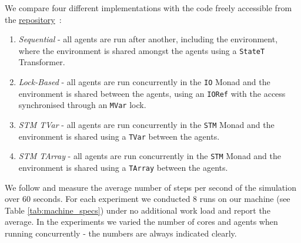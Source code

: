 We compare four different implementations with the code freely accessible from the \href{https://github.com/thalerjonathan/haskell-stm-sugarscape}{repository}~\cite{thaler_stm_sugarscape_repository}:

\begin{enumerate}
	\item \textit{Sequential} - all agents are run after another, including the environment, where the environment is shared amongst the agents using a \texttt{StateT} Transformer.
	\item \textit{Lock-Based} - all agents are run concurrently in the \texttt{IO} Monad and the environment is shared between the agents, using an \texttt{IORef} with the access synchronised through an \texttt{MVar} lock.
	\item \textit{STM TVar} - all agents are run concurrently in the \texttt{STM} Monad and the environment is shared using a \texttt{TVar} between the agents.
	\item \textit{STM TArray} - all agents are run concurrently in the \texttt{STM} Monad and the environment is shared using a \texttt{TArray} between the agents. 
\end{enumerate}

We follow \cite{lysenko_framework_2008} and measure the average number of steps per second of the simulation over 60 seconds. For each experiment we conducted 8 runs on our machine (see Table \ref{tab:machine_specs}) under no additional work load and report the average. In the experiments we varied the number of cores and agents when running concurrently - the numbers are always indicated clearly.


